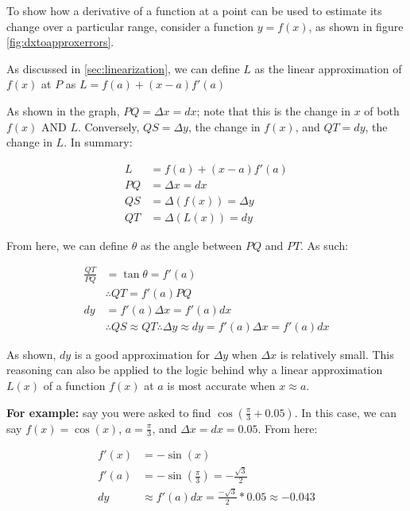 \documentclass[12pt]{article}
\begin{document}
To show how a derivative of a function at a point can be used to estimate its change over a particular range, consider a function $y=f(x)$, as shown in figure \ref{fig:dxtoapproxerrors}.

As discussed in \ref{sec:linearization}, we can define $L$ as the linear approximation of $f(x)$ at $P$ as $L = f(a) + (x-a)f'(a)$

As shown in the graph, $PQ = \Delta x = dx$; note that this is the change in $x$ of both $f(x)$ AND $L$. Conversely, $QS = \Delta y$, the change in $f(x)$, and $QT = dy$, the change in $L$. In summary:

\begin{equation}
    \begin{split}
     L &= f(a) + (x-a)f'(a)\\
     PQ &= \Delta x = dx\\
     QS &= \Delta (f(x)) = \Delta y\\
     QT &= \Delta (L(x)) = dy
    \end{split}
\end{equation}

From here, we can define $\theta$ as the angle between $PQ$ and $PT$. As such:

\begin{equation}
    \begin{split}
        \frac{QT}{PQ} &= \tan \theta = f'(a)\\
        &\therefore QT = f'(a)PQ\\
        dy &= f'(a)\Delta x =  f'(a) dx\\
        &\therefore QS \approx QT \therefore \Delta y \approx dy = f'(a) \Delta x = f'(a) dx
    \end{split}
\end{equation}

As shown, $dy$ is a good approximation for $\Delta y$ when $\Delta x$ is relatively small. This reasoning can also be applied to the logic behind why a linear approximation $L(x)$ of a function $f(x)$ at $a$ is most accurate when $x \approx a$.

\textbf{For example:} say you were asked to find $\cos(\frac{\pi}{3}+0.05)$. In this case, we can say $f(x) = \cos(x)$, $a = \frac{\pi}{3}$, and $\Delta x = dx = 0.05$. From here:

\begin{equation}
    \begin{split}
        f'(x) &= -\sin(x)\\
        f'(a) &= -\sin(\frac{\pi}{3}) = -\frac{\sqrt{3}}{2}\\
        dy &\approx f'(a)dx = \frac{-\sqrt{3}}{2}*0.05 \approx -0.043
    \end{split}
\end{equation}
\end{document}
